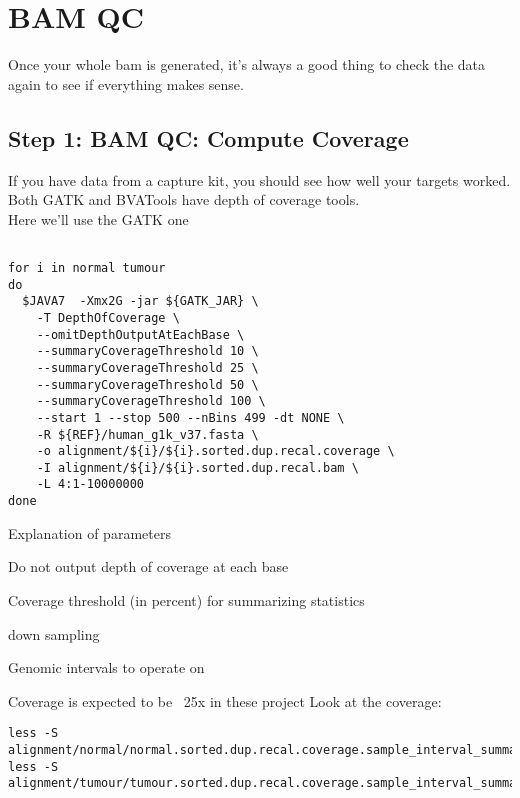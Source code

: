 \section{BAM QC}

Once your whole bam is generated, it's always a good thing to check the data again to see if everything makes sense.

\subsection{Step 1: BAM QC: Compute Coverage}
If you have data from a capture kit, you should see how well your targets worked. Both GATK and BVATools have depth of coverage tools. \\
Here we'll use the GATK one
\begin{lstlisting}

for i in normal tumour
do
  $JAVA7  -Xmx2G -jar ${GATK_JAR} \
    -T DepthOfCoverage \
    --omitDepthOutputAtEachBase \
    --summaryCoverageThreshold 10 \
    --summaryCoverageThreshold 25 \
    --summaryCoverageThreshold 50 \
    --summaryCoverageThreshold 100 \
    --start 1 --stop 500 --nBins 499 -dt NONE \
    -R ${REF}/human_g1k_v37.fasta \
    -o alignment/${i}/${i}.sorted.dup.recal.coverage \
    -I alignment/${i}/${i}.sorted.dup.recal.bam \
    -L 4:1-10000000
done
\end{lstlisting}

\begin{note}
Explanation of parameters
\begin{description}[style=multiline,labelindent=0cm,align=right,leftmargin=\descriptionlabelspace,rightmargin=1.5cm,font=\ttfamily]
 \item[omitBaseOutput] Do not output depth of coverage at each base
 \item[summaryCoverageThreshol] Coverage threshold (in percent) for summarizing statistics
 \item[dt] down sampling
 \item[L] Genomic intervals to operate on
\end{description}
\end{note}

Coverage is expected to be ~25x in these project
Look at the coverage:

\begin{lstlisting}
less -S alignment/normal/normal.sorted.dup.recal.coverage.sample_interval_summary
less -S alignment/tumour/tumour.sorted.dup.recal.coverage.sample_interval_summary
\end{lstlisting}

